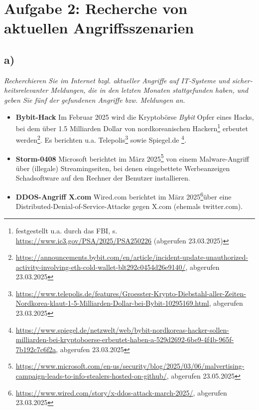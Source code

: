 \chapter{Aufgabe 2:  Recherche von aktuellen Angriffsszenarien}

\section{a)}

\textit{Recherchieren Sie im Internet bzgl. aktueller Angriffe auf IT‐Systeme und sicher‐
heitsrelevanter Meldungen, die in den letzten Monaten stattgefunden haben, und geben Sie fünf der gefundenen Angriffe bzw. Meldungen an. }

\vspace{5mm}

\begin{itemize}
    \itemsep0.5em
    \item \textbf{Bybit-Hack} Im Februar 2025 wird die Kryptobörse \textit{Bybit} Opfer eines Hacks, bei dem über 1.5 Milliarden Dollar von nordkoreanischen Hackern\footnote{
    festgestellt u.a. durch das FBI, s. \url{https://www.ic3.gov/PSA/2025/PSA250226} (abgerufen 23.03.2025)
    } erbeutet werden\footnote{
    \url{https://announcements.bybit.com/en/article/incident-update-unauthorized-activity-involving-eth-cold-wallet-blt292c0454d26e9140/}, abgerufen 23.03.2025
    }. Es berichten u.a. Telepolis\footnote{
        \url{https://www.telepolis.de/features/Groesster-Krypto-Diebstahl-aller-Zeiten-Nordkorea-klaut-1-5-Milliarden-Dollar-bei-Bybit-10295169.html}, abgerufen 23.03.2025
    } sowie Spiegel.de \footnote{
        \url{https://www.spiegel.de/netzwelt/web/bybit-nordkoreas-hacker-sollen-milliarden-bei-kryptoboerse-erbeutet-haben-a-529d2692-6be9-4f4b-965f-7b192c7c6f2a}, abgerufen 23.03.2025
    }.
    \item \textbf{Storm-0408} Microsoft berichtet im März 2025\footnote{
    \url{https://www.microsoft.com/en-us/security/blog/2025/03/06/malvertising-campaign-leads-to-info-stealers-hosted-on-github/}, abgerufen 23.05.2025
    } von einem Malware-Angriff über (illegale) Streamingseiten, bei denen eingebettete Werbeanzeigen Schadsoftware auf den Rechner der Benutzer installieren.
    \item \textbf{DDOS-Angriff X.com} Wired.com berichtet im März 2025\footnote{
    \url{https://www.wired.com/story/x-ddos-attack-march-2025/}, abgerufen 23.03.2025
    }über eine Distributed-Denial-of-Service-Attacke gegen X.com (ehemals twitter.com).


\end{itemize}
